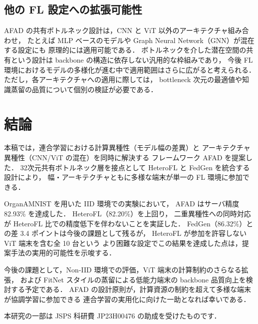 \documentclass[Japanese,noauthor]{dicomopapers}
\begin{document}
\subsection{他の FL 設定への拡張可能性}

AFAD の共有ボトルネック設計は，CNN と ViT 以外のアーキテクチャ組み合わせ，
たとえば MLP ベースのモデルや Graph Neural Network（GNN）が混在する設定にも
原理的には適用可能である．
ボトルネックを介した潜在空間の共有という設計は backbone の構造に依存しない汎用的な枠組みであり，
今後 FL 環境におけるモデルの多様化が進む中で適用範囲はさらに広がると考えられる．
ただし，各アーキテクチャへの適用に際しては，
bottleneck 次元の最適値や知識蒸留の品質について個別の検証が必要である．

\section{結論}

本稿では，連合学習における計算異種性（モデル幅の差異）と
アーキテクチャ異種性（CNN/ViT の混在）を同時に解決する
フレームワーク AFAD を提案した．
32次元共有ボトルネック層を接点として HeteroFL と FedGen を統合する設計により，
幅・アーキテクチャともに多様な端末が単一の FL 環境に参加できる．

OrganAMNIST を用いた IID 環境での実験において，
AFAD はサーバ精度 82.93\% を達成した．
HeteroFL（82.20\%）を上回り，
二重異種性への同時対応が HeteroFL 比での精度低下を伴わないことを実証した．
FedGen（86.32\%）との差 3.4 ポイントは今後の課題として残るが，
HeteroFL が参加を許容しない ViT 端末を含む全 10 台という
より困難な設定でこの結果を達成した点は，提案手法の実用的可能性を示唆する．

今後の課題として，Non-IID 環境での評価，ViT 端末の計算制約のさらなる拡張，
および FitNet スタイルの蒸留による低能力端末の backbone 品質向上を検討する予定である．
AFAD の設計原則が，計算資源の制約を超えて多様な端末が協調学習に参加できる
連合学習の実用化に向けた一助となれば幸いである．

\begin{acknowledgment}
本研究の一部は JSPS 科研費 JP23H00476 の助成を受けたものです．
\end{acknowledgment}



\end{document}
